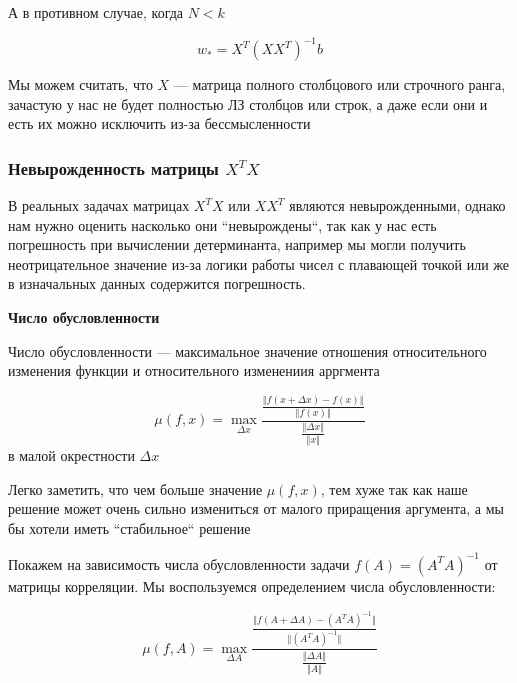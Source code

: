 \documentclass{article}
\begin{document}
    А в противном случае, когда $N < k$

    \begin{equation}
        w_{*} = X^{T} (X X^{T})^{-1} b
    \end{equation}

    Мы можем считать, что $X$ --- матрица полного столбцового или строчного ранга, зачастую у нас не будет полностью ЛЗ столбцов или строк, а
    даже если они и есть их можно исключить из-за бессмысленности

    \subsubsection{Невырожденность матрицы $X^{T} X$}

    В реальных задачах матрицах $X^{T} X$ или $X X^{T}$ являются невырожденными, однако нам нужно оценить насколько они
    ``невырождены``, так как у нас есть погрешность при вычислении детерминанта, например мы могли получить неотрицательное значение
    из-за логики работы чисел с плавающей точкой или же в изначальных данных содержится погрешность.

    \quad

    \textbf{Число обусловленности}

    \quad


    Число обусловленности --- максимальное значение отношения относительного изменения функции и относительного изменениия арргмента

    \begin{equation}
        \mu(f, x) = \max_{\Delta x} \frac{ \frac{\Vert f(x + \Delta x) - f(x) \Vert}{\Vert f(x) \Vert}  }{ \frac{\Vert \Delta x \Vert}{\Vert x \Vert } }
    \end{equation}
    в малой окрестности $\Delta x$

    Легко заметить, что чем больше значение $\mu(f, x)$, тем хуже так как наше решение может очень сильно измениться от малого приращения аргумента, а мы бы хотели
    иметь ``стабильное`` решение

    \quad

    Покажем на зависимость числа обусловленности задачи $f(A) = (A^T A)^{-1}$ от матрицы корреляции.
    Мы воспользуемся определением числа обусловленности:

    \begin{equation}
        \mu(f, A) = \max_{\Delta A} \frac{ \frac{\Vert f(A + \Delta A) - (A^T A)^{-1}  \Vert }{\Vert (A^T A)^{-1} \Vert} }{ \frac{\Vert \Delta A \Vert}{\Vert A \Vert} }
    \end{equation}
\end{document}
